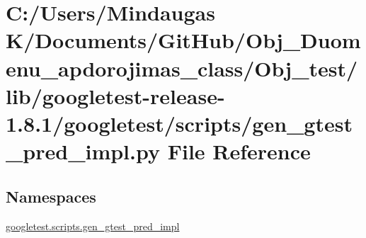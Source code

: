 \hypertarget{_obj__test_2lib_2googletest-release-1_88_81_2googletest_2scripts_2gen__gtest__pred__impl_8py}{}\section{C\+:/\+Users/\+Mindaugas K/\+Documents/\+Git\+Hub/\+Obj\+\_\+\+Duomenu\+\_\+apdorojimas\+\_\+class/\+Obj\+\_\+test/lib/googletest-\/release-\/1.8.1/googletest/scripts/gen\+\_\+gtest\+\_\+pred\+\_\+impl.py File Reference}
\label{_obj__test_2lib_2googletest-release-1_88_81_2googletest_2scripts_2gen__gtest__pred__impl_8py}
\subsection*{Namespaces}
\begin{DoxyCompactItemize}
\item 
 \mbox{\hyperlink{namespacegoogletest_1_1scripts_1_1gen__gtest__pred__impl}{googletest.\+scripts.\+gen\+\_\+gtest\+\_\+pred\+\_\+impl}}
\end{DoxyCompactItemize}
